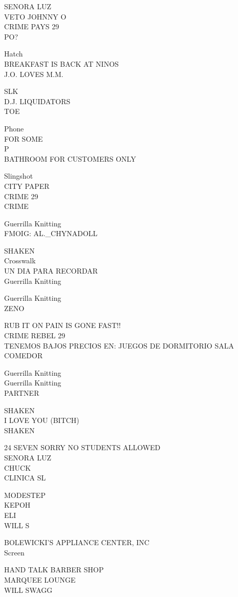\documentclass[10pt,letterpaper]{article}
\begin{document}
SENORA LUZ\\
VETO JOHNNY O\\
CRIME PAYS 29\\
PO?

Hatch\\
BREAKFAST IS BACK AT NINOS\\
J.O. LOVES M.M.

SLK\\
D.J. LIQUIDATORS\\
TOE

Phone\\
FOR SOME\\
P\\
BATHROOM FOR CUSTOMERS ONLY

Slingshot\\
CITY PAPER\\
CRIME 29\\
CRIME

Guerrilla Knitting\\
FMOIG: AL.\_CHYNADOLL

SHAKEN\\
Crosswalk\\
UN DIA PARA RECORDAR\\
Guerrilla Knitting

Guerrilla Knitting\\
ZENO

RUB IT ON PAIN IS GONE FAST!!\\
CRIME REBEL 29\\
TENEMOS BAJOS PRECIOS EN: JUEGOS DE DORMITORIO SALA COMEDOR

Guerrilla Knitting\\
Guerrilla Knitting\\
PARTNER

SHAKEN\\
I LOVE YOU (BITCH)\\
SHAKEN

24 SEVEN SORRY NO STUDENTS ALLOWED\\
SENORA LUZ\\
CHUCK\\
CLINICA SL

MODESTEP\\
KEPOH\\
ELI\\
WILL S

BOLEWICKI'S APPLIANCE CENTER, INC\\
Screen

HAND TALK BARBER SHOP\\
MARQUEE LOUNGE\\
WILL SWAGG
\end{document}
